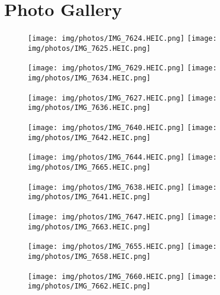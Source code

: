 \section{Photo Gallery}
\vspace{2em}
\begin{figure}[H]
  \centering
    \texttt{[image: img/photos/IMG\_7624.HEIC.png]}\hspace{5em}
    \texttt{[image: img/photos/IMG\_7625.HEIC.png]}

    \vspace{1em}
    \texttt{[image: img/photos/IMG\_7629.HEIC.png]}\hspace{5em}
    \texttt{[image: img/photos/IMG\_7634.HEIC.png]}

    \vspace{1em}
    \texttt{[image: img/photos/IMG\_7627.HEIC.png]}\hspace{5em}
    \texttt{[image: img/photos/IMG\_7636.HEIC.png]}
\end{figure}

\newpage
\begin{figure}[H]
  \centering
    \texttt{[image: img/photos/IMG\_7640.HEIC.png]}\hspace{5em}
    \texttt{[image: img/photos/IMG\_7642.HEIC.png]}

    \vspace{1em}
    \texttt{[image: img/photos/IMG\_7644.HEIC.png]}\hspace{5em}
    \texttt{[image: img/photos/IMG\_7665.HEIC.png]}

    \vspace{1em}
    \texttt{[image: img/photos/IMG\_7638.HEIC.png]}\hspace{5em}
    \texttt{[image: img/photos/IMG\_7641.HEIC.png]}
\end{figure}

\begin{figure}[H]
  \centering
    \texttt{[image: img/photos/IMG\_7647.HEIC.png]}\hspace{5em}
    \texttt{[image: img/photos/IMG\_7663.HEIC.png]}

    \vspace{5em}
    \texttt{[image: img/photos/IMG\_7655.HEIC.png]}\hspace{5em}
    \texttt{[image: img/photos/IMG\_7658.HEIC.png]}

    \vspace{2em}
    \texttt{[image: img/photos/IMG\_7660.HEIC.png]}\hspace{5em}
    \texttt{[image: img/photos/IMG\_7662.HEIC.png]}
\end{figure}